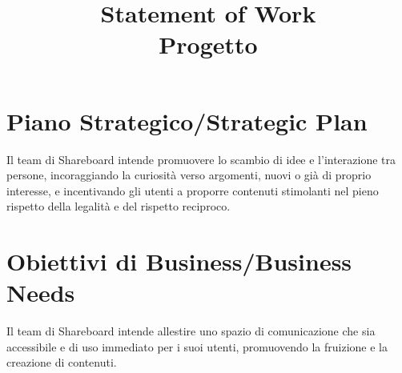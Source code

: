 \documentclass[12pt]{article}
\title{Statement of Work\\Progetto}
\author{\presentatoda}
\begin{document}
\maketitle

\begin{versionhistory}
\end{versionhistory}
\clearpage

\section{Piano Strategico/Strategic Plan}
  Il team di Shareboard intende promuovere lo scambio di idee e l’interazione tra persone, incoraggiando la curiosità verso argomenti, nuovi o già di proprio interesse, e incentivando gli utenti a proporre contenuti stimolanti nel pieno rispetto della legalità e del rispetto reciproco.
  
  \section{Obiettivi di Business/Business Needs}
  Il team di Shareboard intende allestire uno spazio di comunicazione che sia accessibile e di uso immediato per i suoi utenti, promuovendo la fruizione e la creazione di contenuti.
  
\end{document}
